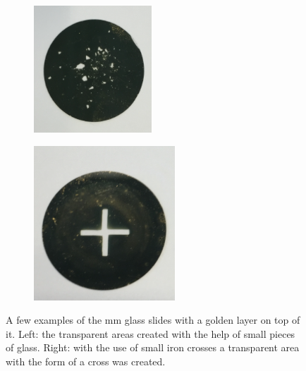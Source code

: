 \documentclass[twoside,single]{lion-msc}
\begin{document}
\begin{figure}
\begin{subfigure}{.5\textwidth}
  \centering
  \includegraphics[width=.7\linewidth]{glass}
  \label{cross}
\end{subfigure}%
\begin{subfigure}{.5\textwidth}
  \centering
  \includegraphics[width=.7\linewidth]{cross}
  \label{glass}
\end{subfigure}
\caption{A few examples of the  mm glass slides with a golden layer on top of it. Left: the transparent areas created with the help of small pieces of glass. Right: with the use of small iron crosses a transparent area with the form of a cross was created.}
\label{gold_layer}
\end{figure}
\end{document}
